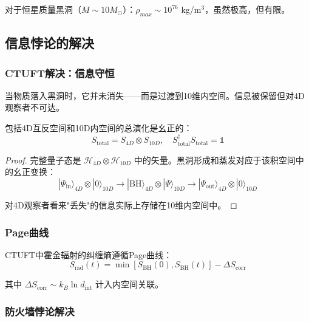 对于恒星质量黑洞（$M \sim 10M_\odot$）：$\rho_{max} \sim 10^{76}$ kg/m$^3$，虽然极高，但有限。

\subsection{信息悖论的解决}

\subsubsection{CTUFT解决：信息守恒}

\begin{insight}[信息流向内空间]
当物质落入黑洞时，它并未消失——而是过渡到10维内空间。信息被保留但对4D观察者不可达。
\end{insight}

\begin{theorem}[CTUFT中的幺正演化]
包括4D互反空间和10D内空间的总演化是幺正的：
\begin{equation}
    S_{\text{total}} = S_{4D} \otimes S_{10D}, \quad S_{\text{total}}^\dagger S_{\text{total}} = \mathbb{1}
\end{equation}
\end{theorem}

\begin{proof}
完整量子态是 $\mathcal{H}_{4D} \otimes \mathcal{H}_{10D}$ 中的矢量。黑洞形成和蒸发对应于该积空间中的幺正变换：
\begin{equation}
    |\Psi_{\text{in}}\rangle_{4D} \otimes |0\rangle_{10D} \to |\text{BH}\rangle_{4D} \otimes |\Psi\rangle_{10D} \to |\Psi_{\text{out}}\rangle_{4D} \otimes |0\rangle_{10D}
\end{equation}

对4D观察者看来"丢失"的信息实际上存储在10维内空间中。
\end{proof}

\subsubsection{Page曲线}

CTUFT中霍金辐射的纠缠熵遵循Page曲线：
\begin{equation}
    S_{\text{rad}}(t) = \min\left[S_{\text{BH}}(0), S_{\text{BH}}(t)\right] - \Delta S_{\text{corr}}
\end{equation}

其中 $\Delta S_{\text{corr}} \sim k_B \ln d_{\text{int}}$ 计入内空间关联。

\subsubsection{防火墙悖论解决}

